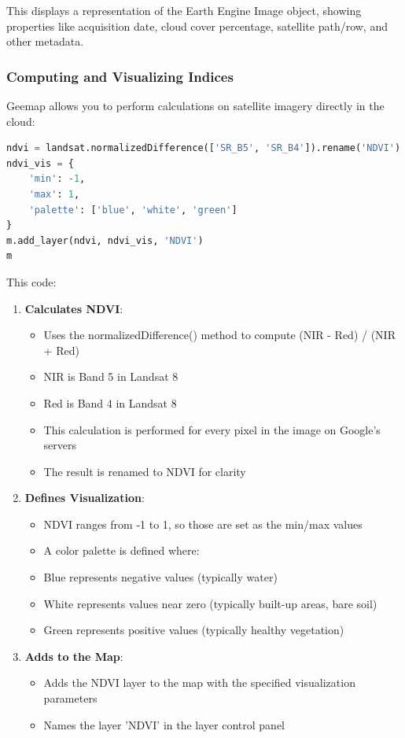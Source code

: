 This displays a representation of the Earth Engine Image object, showing properties like acquisition date, cloud cover percentage, satellite path/row, and other metadata.

\subsubsection{Computing and Visualizing Indices}

Geemap allows you to perform calculations on satellite imagery directly in the cloud:

\begin{lstlisting}[language=Python]
ndvi = landsat.normalizedDifference(['SR_B5', 'SR_B4']).rename('NDVI')
ndvi_vis = {
    'min': -1,
    'max': 1,
    'palette': ['blue', 'white', 'green']
}
m.add_layer(ndvi, ndvi_vis, 'NDVI')
m
\end{lstlisting}

This code:

\begin{enumerate}
\item \textbf{Calculates NDVI}:
   \begin{itemize}
   \item Uses the normalizedDifference() method to compute (NIR - Red) / (NIR + Red)
   \item NIR is Band 5 in Landsat 8
   \item Red is Band 4 in Landsat 8
   \item This calculation is performed for every pixel in the image on Google's servers
   \item The result is renamed to NDVI for clarity
   \end{itemize}

\item \textbf{Defines Visualization}:
   \begin{itemize}
   \item NDVI ranges from -1 to 1, so those are set as the min/max values
   \item A color palette is defined where:
   \item Blue represents negative values (typically water)
   \item White represents values near zero (typically built-up areas, bare soil)
   \item Green represents positive values (typically healthy vegetation)
   \end{itemize}

\item \textbf{Adds to the Map}:
   \begin{itemize}
   \item Adds the NDVI layer to the map with the specified visualization parameters
   \item Names the layer 'NDVI' in the layer control panel
   \end{itemize}
\end{enumerate}

